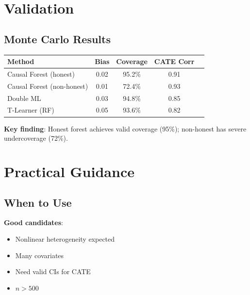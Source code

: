 \section{Validation}
\label{sec:forest_validation}

\subsection{Monte Carlo Results}

\begin{center}
\begin{tabular}{lcccc}
\toprule
Method & Bias & Coverage & CATE Corr \\
\midrule
Causal Forest (honest) & 0.02 & 95.2\% & 0.91 \\
Causal Forest (non-honest) & 0.01 & 72.4\% & 0.93 \\
Double ML & 0.03 & 94.8\% & 0.85 \\
T-Learner (RF) & 0.05 & 93.6\% & 0.82 \\
\bottomrule
\end{tabular}
\end{center}

\textbf{Key finding}: Honest forest achieves valid coverage (95\%); non-honest has severe undercoverage (72\%).

\section{Practical Guidance}
\label{sec:forest_guidance}

\subsection{When to Use}

\textbf{Good candidates}:
\begin{itemize}
    \item Nonlinear heterogeneity expected
    \item Many covariates
    \item Need valid CIs for CATE
    \item $n > 500$
\end{itemize}

